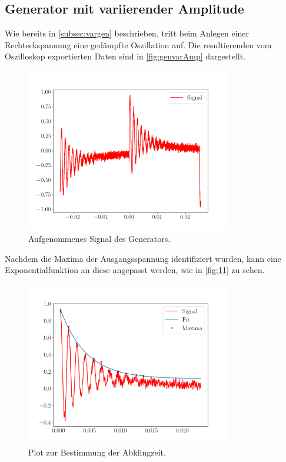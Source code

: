 \documentclass[12pt]{article}
\begin{document}
\subsection{Generator mit variierender Amplitude}
Wie bereits in \autoref{subsec:vargen} beschrieben, tritt beim Anlegen einer Rechteckspannung eine gedämpfte Oszillation auf. Die resultierenden vom Oszilloskop exportierten Daten sind in \autoref{fig:genvarAmp} dargestellt.
\begin{figure}[H]
  \centering
  \includegraphics[width=0.8\textwidth]{Ressourcen/signal_13.png}
  \caption{Aufgenommenes Signal des Generators.}
  \label{fig:genvarAmp}
\end{figure}
Nachdem die Maxima der Ausgangsspannung identifiziert wurden, kann eine Exponentialfunktion an diese angepasst werden, wie in \autoref{fig:11} zu sehen.
\begin{figure}[H]
  \centering
  \includegraphics[width=0.8\textwidth]{Ressourcen/genvar_plot.png}
  \caption{Plot zur Bestimmung der Abklingzeit.}
  \label{fig:11}
\end{figure}
\end{document}
